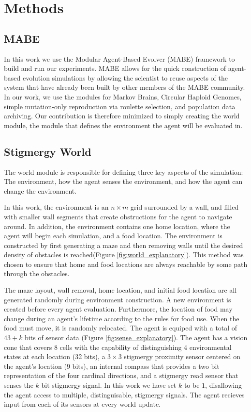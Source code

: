 \section{Methods}

\subsection{MABE}

In this work we use the Modular Agent-Based Evolver\cite{bohm_mabe_2017}  (MABE) framework to build and run our experiments. MABE allows for the quick construction of agent-based evolution simulations by allowing the scientist to reuse aspects of the system that have already been built by other members of the MABE community. In our work, we use the modules for Markov Brains, Circular Haploid Genomes, simple mutation-only reproduction via roulette selection, and population data archiving. Our contribution is therefore minimized to simply creating the world module, the module that defines the environment the agent will be evaluated in.

\subsection{Stigmergy World}

The world module is responsible for defining three key aspects of the simulation: The environment, how the agent senses the environment, and how the agent can change the environment.

In this work, the environment is an $n\times m$ grid surrounded by a wall, and filled with smaller wall segments that create obstructions for the agent to navigate around. In addition, the environment contains one home location, where the agent will begin each simulation, and a food location. The environment is constructed by first generating a maze and then removing walls until the desired density of obstacles is reached(Figure \ref{fig:world_explanatory}). This method was chosen to ensure that home and food locations are always reachable by some path through the obstacles.



The maze layout, wall removal, home location, and initial food location are all generated randomly during environment construction. A new environment is created before every agent evaluation. Furthermore, the location of food may change during an agent's lifetime according to the rules for food use. When the food must move, it is randomly relocated.
The agent is equiped with a total of $43+k$ bits of sensor data (Figure \ref{fig:sense_explanatory}). The agent has a vision cone that covers 8 cells with the capability of distinguishing 4 environmental states at each location (32 bits), a $3\times 3$ stigmergy proximity sensor centered on the agent's location (9 bits), an internal compass that provides a two bit representation of the four cardinal directions, and a stigmergy read sensor that senses  the $k$ bit stigmergy signal. In this work we have set $k$ to be $1$, disallowing the agent access to multiple, distinguisable, stigmergy signals. The agent recieves input from each of its sensors at every world update.

